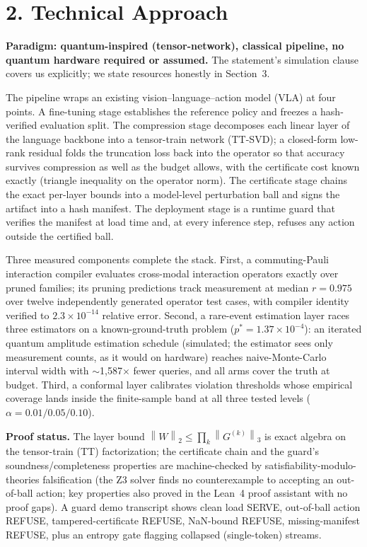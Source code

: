 \documentclass[10pt]{article}
\newcommand{\norm}[1]{\left\lVert #1 \right\rVert}
\begin{document}
\section*{2. Technical Approach}
\textbf{Paradigm: quantum-inspired (tensor-network), classical pipeline,
no quantum hardware required or assumed.} The statement's simulation clause
covers us explicitly; we state resources honestly in Section~3.

The pipeline wraps an existing vision--language--action model (VLA) at four
points. A fine-tuning stage
establishes the reference policy and freezes a hash-verified evaluation split.
The compression stage decomposes each linear layer of the language backbone
into a tensor-train network (TT-SVD); a closed-form low-rank residual folds
the truncation loss back into the operator so that accuracy survives
compression as well as the budget allows, with the certificate cost known
exactly (triangle inequality on the operator norm). The certificate stage
chains the exact per-layer bounds into a model-level perturbation ball and
signs the artifact into a hash manifest. The deployment stage is a runtime
guard that verifies the manifest at load time and, at every inference step,
refuses any action outside the certified ball.

Three measured components complete the stack. First, a commuting-Pauli
interaction compiler evaluates cross-modal interaction operators exactly over
pruned families; its pruning predictions track measurement at median
$r = 0.975$ over twelve independently generated operator test cases, with compiler identity
verified to $2.3\times10^{-14}$ relative error. Second, a rare-event
estimation layer races three estimators on a known-ground-truth problem
($p^{*}=1.37\times10^{-4}$): an iterated quantum amplitude estimation schedule
(simulated; the estimator sees only measurement counts, as it would on
hardware) reaches naive-Monte-Carlo interval width with
$\sim$1{,}587$\times$ fewer queries, and all arms cover the truth at budget.
Third, a conformal layer calibrates violation thresholds whose empirical
coverage lands inside the finite-sample band at all three tested levels
($\alpha = 0.01/0.05/0.10$).

\textbf{Proof status.} The layer bound $\norm{W}_{2} \le \prod_k
\norm{G^{(k)}}_{3}$ is exact algebra on the tensor-train (TT) factorization; the certificate
chain and the guard's soundness/completeness properties are machine-checked
by satisfiability-modulo-theories falsification (the Z3 solver finds no
counterexample to accepting an out-of-ball action; key properties also
proved in the Lean~4 proof assistant with no proof gaps). A guard demo
transcript shows clean load SERVE, out-of-ball action REFUSE,
tampered-certificate REFUSE, NaN-bound REFUSE, missing-manifest REFUSE,
plus an entropy gate flagging collapsed (single-token) streams.
\end{document}
